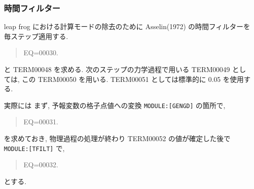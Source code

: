 \subsubsection{時間フィルター}


leap frog における計算モードの除去のために 
Asselin(1972) の時間フィルターを毎ステップ適用する.
%
\begin{quote}
EQ=00030.
\end{quote}
%
と TERM00048 を求める.
次のステップの力学過程で用いる TERM00049 としては,
この TERM00050 を用いる.
TERM00051 としては標準的に 0.05 を使用する. 

実際には
まず, 予報変数の格子点値への変換 \texttt{MODULE:[GENGD]} の箇所で,
\begin{quote}
EQ=00031.
\end{quote}
を求めておき, 物理過程の処理が終わり
TERM00052 の値が確定した後で \texttt{MODULE:[TFILT]} で,
\begin{quote}
EQ=00032.
\end{quote}
とする.
